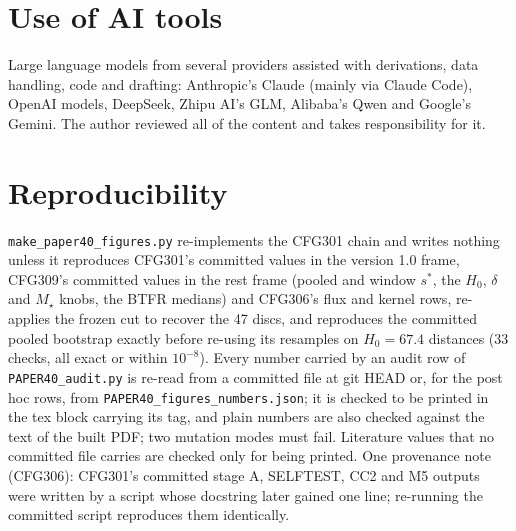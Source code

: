 \documentclass[10pt]{article}
\newcommand{\fpath}[1]{\nolinkurl{#1}}
\begin{document}
\section*{Use of AI tools}
Large language models from several providers assisted with derivations, data handling, code and drafting: Anthropic's Claude (mainly via Claude Code), OpenAI models, DeepSeek, Zhipu AI's GLM, Alibaba's Qwen and Google's Gemini. The author reviewed all of the content and takes responsibility for it.

\section*{Reproducibility}
\fpath{make_paper40_figures.py} re-implements the CFG301 chain and writes nothing unless it reproduces CFG301's committed values in the version 1.0 frame, CFG309's committed values in the rest frame (pooled and window $s^*$, the $H_0$, $\delta$ and $M_\star$ knobs, the BTFR medians) and CFG306's flux and kernel rows, re-applies the frozen cut to recover the 47 discs, and reproduces the committed pooled bootstrap exactly before re-using its resamples on $H_0=67.4$ distances (33 checks, all exact or within $10^{-8}$). Every number carried by an audit row of \fpath{PAPER40_audit.py} is re-read from a committed file at git HEAD or, for the post hoc rows, from \fpath{PAPER40_figures_numbers.json}; it is checked to be printed in the tex block carrying its tag, and plain numbers are also checked against the text of the built PDF; two mutation modes must fail. Literature values that no committed file carries are checked only for being printed. One provenance note (CFG306): CFG301's committed stage A, SELFTEST, CC2 and M5 outputs were written by a script whose docstring later gained one line; re-running the committed script reproduces them identically.
\end{document}
